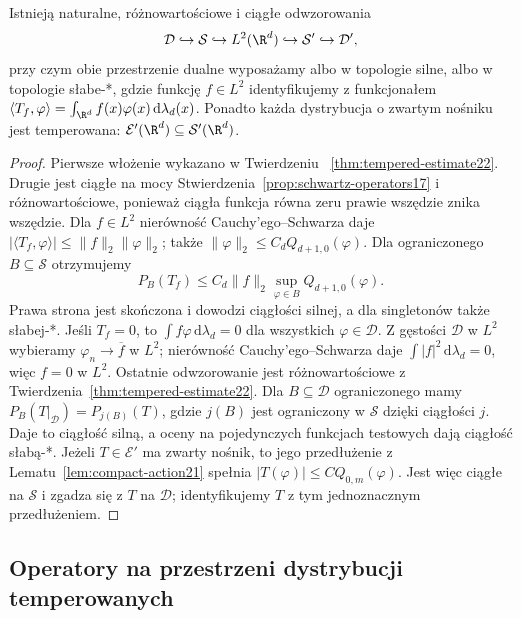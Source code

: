 \begin{stwierdzenie}
\label{prop:schwartz-embeddings22}
Istnieją naturalne, różnowartościowe i ciągłe odwzorowania
\[
 \mathcal D\hookrightarrow\mathcal S\hookrightarrow
 L^2(\R^d)\hookrightarrow\mathcal S'\hookrightarrow\mathcal D',
\]
przy czym obie przestrzenie dualne wyposażamy albo
w topologie silne, albo w topologie słabe-*,
gdzie funkcję $f\in L^2$ identyfikujemy z funkcjonałem
$\langle T_f,\varphi\rangle=\int_{\R^d}f(x)\varphi(x)
\,\mathrm d\lambda_d(x)$.
Ponadto każda dystrybucja o zwartym nośniku jest temperowana:
$\mathcal E'(\R^d)\subseteq\mathcal S'(\R^d)$.
\end{stwierdzenie}
\begin{proof}
Pierwsze włożenie wykazano w Twierdzeniu~
\ref{thm:tempered-estimate22}. Drugie jest ciągłe na mocy
Stwierdzenia~\ref{prop:schwartz-operators17} i różnowartościowe,
ponieważ ciągła funkcja równa zeru prawie wszędzie znika
wszędzie. Dla $f\in L^2$ nierówność Cauchy'ego--Schwarza daje
$|\langle T_f,\varphi\rangle|\le\|f\|_2\|\varphi\|_2$;
także $\|\varphi\|_2\le C_dQ_{d+1,0}(\varphi)$.
Dla ograniczonego $B\subseteq\mathcal S$ otrzymujemy
\[
 P_B(T_f)\le C_d\|f\|_2\sup_{\varphi\in B}Q_{d+1,0}(\varphi).
\]
Prawa strona jest skończona i dowodzi ciągłości silnej,
a dla singletonów także słabej-*.
Jeśli $T_f=0$, to $\int f\varphi\,\mathrm d\lambda_d=0$
dla wszystkich $\varphi\in\mathcal D$.
Z gęstości $\mathcal D$ w $L^2$ wybieramy $\varphi_n\to
\overline f$ w $L^2$; nierówność Cauchy'ego--Schwarza daje
$\int |f|^2\,\mathrm d\lambda_d=0$, więc $f=0$ w $L^2$.
Ostatnie odwzorowanie jest różnowartościowe z
Twierdzenia~\ref{thm:tempered-estimate22}. Dla
$B\subseteq\mathcal D$ ograniczonego mamy
$P_B(T|_{\mathcal D})=P_{j(B)}(T)$, gdzie $j(B)$ jest
ograniczony w $\mathcal S$ dzięki ciągłości $j$.
Daje to ciągłość silną, a oceny na pojedynczych
funkcjach testowych dają ciągłość słabą-*.
Jeżeli $T\in\mathcal E'$ ma zwarty nośnik,
to jego przedłużenie z Lematu~\ref{lem:compact-action21}
spełnia $|T(\varphi)|\le C Q_{0,m}(\varphi)$.
Jest więc ciągłe na $\mathcal S$ i zgadza się z $T$
na $\mathcal D$; identyfikujemy $T$ z tym jednoznacznym
przedłużeniem.
\end{proof}

\subsection{Operatory na przestrzeni dystrybucji temperowanych}

